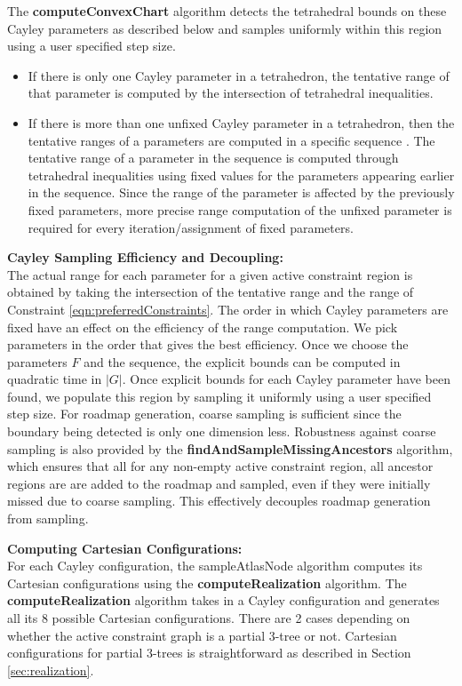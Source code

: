 \documentclass[]{article}
\newcommand{\ctwo}{\ref{eqn:preferredConstraints}}
\begin{document}
The \textbf{computeConvexChart} algorithm detects the tetrahedral bounds
on these Cayley parameters as described below and samples uniformly within this
region using a user specified step size.  

\begin{itemize} 

\item If there is only one Cayley parameter in a tetrahedron, the tentative
range of that parameter is computed by the intersection of tetrahedral
inequalities.

\item If there is more than one unfixed Cayley parameter in a tetrahedron,
then the tentative ranges of a parameters are computed in a specific sequence
\cite{ugandhar}. The tentative range of a parameter in the sequence is computed
through tetrahedral inequalities using fixed values for the parameters
appearing earlier in the sequence. Since the range of the parameter is affected
by the previously fixed parameters, more precise range computation of the
unfixed parameter is required for every iteration/assignment of fixed
parameters.  

\end{itemize}

\noindent \textbf{Cayley Sampling Efficiency and Decoupling:\\}
The actual range for each parameter for a given active constraint region is obtained by taking the intersection of
the tentative range and the range of Constraint \ctwo. The order
in which Cayley parameters are fixed have an effect on the efficiency of the
range computation. We pick parameters in the order that gives
the best efficiency\cite{ugandhar}. Once we choose the parameters $F$ and the sequence, the
explicit bounds can be computed in quadratic time in $|G|$.  Once explicit
bounds for each Cayley parameter have been found, we populate this region by
sampling it uniformly using a user specified step size. For roadmap generation,
coarse sampling is 
sufficient since the boundary being detected is only one dimension less.
Robustness against coarse sampling is also provided by the 
\textbf{findAndSampleMissingAncestors} algorithm, which ensures that all 
for any non-empty active constraint region, all ancestor regions are 
are added to the roadmap and sampled, even if they were initially missed 
due to coarse sampling. This effectively
decouples roadmap generation from sampling.

\noindent\textbf{Computing Cartesian Configurations:\\}
For each Cayley configuration, the sampleAtlasNode algorithm computes its
Cartesian configurations using the \textbf{computeRealization} algorithm.  The
\textbf{computeRealization} algorithm takes in a Cayley configuration and generates all
its 8 possible Cartesian configurations. There are 2 cases depending on
whether the active constraint graph is a partial 3-tree or not.  Cartesian
configurations for partial 3-trees is straightforward as described in Section
\ref{sec:realization}. 
\end{document}
